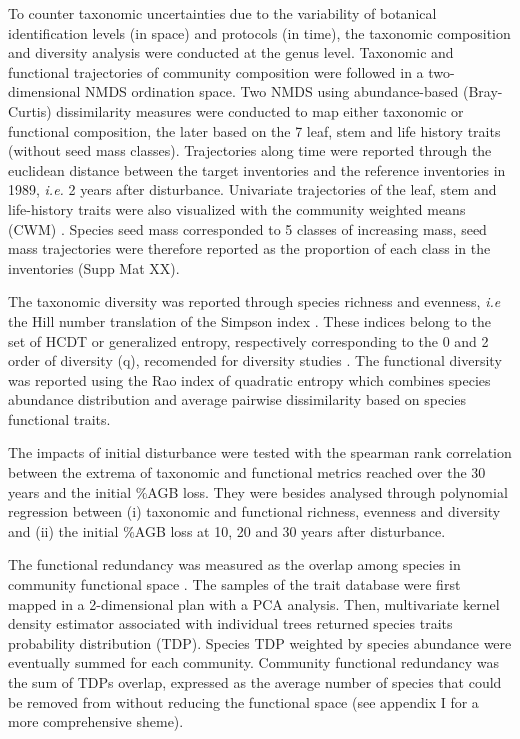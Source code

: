 \documentclass[fleqn,10pt]{ArtEcoFoG} %
\begin{document}
To counter taxonomic uncertainties due to the variability of botanical
identification levels (in space) and protocols (in time), the taxonomic
composition and diversity analysis were conducted at the genus level.
Taxonomic and functional trajectories of community composition were
followed in a two-dimensional NMDS ordination space. Two NMDS using
abundance-based (Bray-Curtis) dissimilarity measures were conducted to
map either taxonomic or functional composition, the later based on the 7
leaf, stem and life history traits (without seed mass classes).
Trajectories along time were reported through the euclidean distance
between the target inventories and the reference inventories in 1989,
\emph{i.e.} 2 years after disturbance. Univariate trajectories of the
leaf, stem and life-history traits were also visualized with the
community weighted means (CWM) \citep{Diaz2007, Garnier2004}. Species
seed mass corresponded to 5 classes of increasing mass, seed mass
trajectories were therefore reported as the proportion of each class in
the inventories (Supp Mat XX).

The taxonomic diversity was reported through species richness and
evenness, \emph{i.e} the Hill number translation of the Simpson index
\citep{Hill1973}. These indices belong to the set of HCDT or generalized
entropy, respectively corresponding to the 0 and 2 order of diversity
(q), recomended for diversity studies
\citep{Patil1982, Tothmeresz1995, Marcon2015}. The functional diversity
was reported using the Rao index of quadratic entropy which combines
species abundance distribution and average pairwise dissimilarity based
on species functional traits.

The impacts of initial disturbance were tested with the spearman rank
correlation between the extrema of taxonomic and functional metrics
reached over the 30 years and the initial \%AGB loss. They were besides
analysed through polynomial regression between (i) taxonomic and
functional richness, evenness and diversity and (ii) the initial \%AGB
loss at 10, 20 and 30 years after disturbance.

The functional redundancy was measured as the overlap among species in
community functional space \citep{Carmona2016}. The samples of the trait
database were first mapped in a 2-dimensional plan with a PCA analysis.
Then, multivariate kernel density estimator associated with individual
trees returned species traits probability distribution (TDP). Species
TDP weighted by species abundance were eventually summed for each
community. Community functional redundancy was the sum of TDPs overlap,
expressed as the average number of species that could be removed from
without reducing the functional space (see appendix I for a more
comprehensive sheme).
\end{document}
